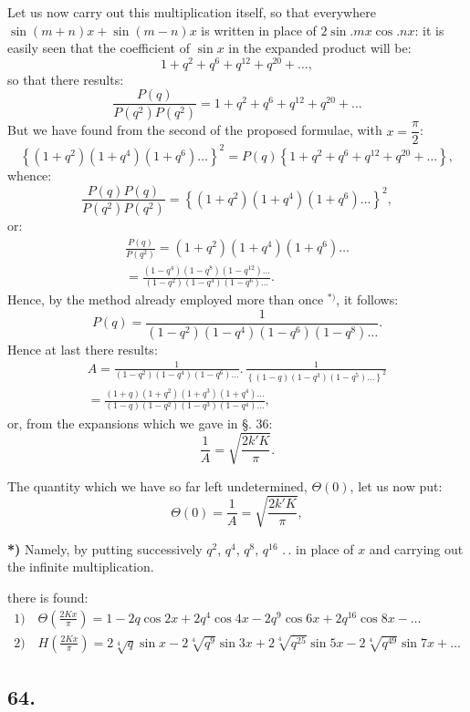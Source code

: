 \documentclass{article}
\begin{document}
Let us now carry out this multiplication itself, so that everywhere $\sin(m+n)x+\sin(m-n)x$ is written in place of $2\sin.mx\cos.nx$: it is easily seen that the coefficient of $\sin x$ in the expanded product will be:
\[
1+q^{2}+q^{6}+q^{12}+q^{20}+\ldots,
\]
so that there results:
\[
\frac{P(q)}{P(q^{2})P(q^{2})}=1+q^{2}+q^{6}+q^{12}+q^{20}+\ldots
\]
But we have found from the second of the proposed formulae, with $x=\dfrac{\pi}{2}$:
\[
\left\{(1+q^{2})(1+q^{4})(1+q^{6})\ldots\right\}^{2}=P(q)\left\{1+q^{2}+q^{6}+q^{12}+q^{20}+\ldots\right\},
\]
whence:
\[
\frac{P(q)P(q)}{P(q^{2})P(q^{2})}=\left\{(1+q^{2})(1+q^{4})(1+q^{6})\ldots\right\}^{2},
\]
or:
\[
\begin{gathered}
\frac{P(q)}{P(q^{2})}=(1+q^{2})(1+q^{4})(1+q^{6})\ldots\\[1.5ex]
=\frac{(1-q^{4})(1-q^{8})(1-q^{12})\ldots}{(1-q^{2})(1-q^{4})(1-q^{6})\ldots}.
\end{gathered}
\]
Hence, by the method already employed more than once ${}^{*)}$, it follows:
\[
P(q)=\frac{1}{(1-q^{2})(1-q^{4})(1-q^{6})(1-q^{8})\ldots}.
\]
Hence at last there results:
\[
\begin{gathered}
A=\frac{1}{(1-q^{2})(1-q^{4})(1-q^{6})\ldots}.\,\frac{1}{\left\{(1-q)(1-q^{3})(1-q^{5})\ldots\right\}^{2}}\\[1.5ex]
=\frac{(1+q)(1+q^{2})(1+q^{3})(1+q^{4})\ldots}{(1-q)(1-q^{2})(1-q^{3})(1-q^{4})\ldots},
\end{gathered}
\]
or, from the expansions which we gave in §. 36:
\[
\frac{1}{A}=\sqrt{\frac{2k'K}{\pi}}.
\]

The quantity which we have so far left undetermined, $\Theta(0)$, let us now put:
\[
\Theta(0)=\frac{1}{A}=\sqrt{\frac{2k'K}{\pi}},
\]

\textbf{*)} Namely, by putting successively $q^{2}$, $q^{4}$, $q^{8}$, $q^{16}$ $.\,.$ in place of $x$ and carrying out the infinite multiplication.

there is found:
\[
\begin{gathered}
\text{1)}\quad\Theta\left(\frac{2Kx}{\pi}\right)=1-2q\cos 2x+2q^{4}\cos 4x-2q^{9}\cos 6x+2q^{16}\cos 8x-\ldots\\[2ex]
\text{2)}\quad H\left(\frac{2Kx}{\pi}\right)=2\sqrt[4]{q}\sin x-2\sqrt[4]{q^{9}}\sin 3x+2\sqrt[4]{q^{25}}\sin 5x-2\sqrt[4]{q^{49}}\sin 7x+\ldots
\end{gathered}
\]

\subsection*{64.}
\end{document}
